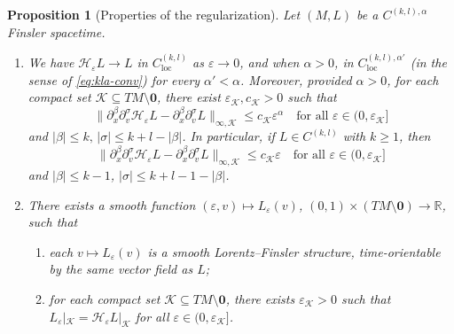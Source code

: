 \documentclass[a4paper,11pt]{article}
\numberwithin{equation}{section}
\theoremstyle{definition}
\theoremstyle{plain}
\newtheorem{Proposition}[Definition]{Proposition}
\newcommand{\R}{\mathbb R}
\newcommand{\eps}{\varepsilon}
\newcommand{\loc}{\mathrm{loc}}
\begin{document}
\begin{Proposition}[Properties of the regularization]\label{prop:PropertiesApproximation}
Let $(M,L)$ be a $C^{(k,l),\alpha}$ Finsler spacetime.
\begin{enumerate}
    \item
    \label{PropApproximation1}
    We have $\mathcal{H}_\eps L \to L$ in $C^{(k,l)}_{\loc}$ as $\eps \rightarrow 0$, and when $\alpha >0$, in $C^{(k,l), \alpha'}_{\loc}$ \textnormal{(}in the sense of \eqref{eq:kla-conv}\textnormal{)} for every $\alpha' < \alpha$.
    Moreover, provided $\alpha>0$, for each compact set $\mathcal K \subseteq TM \setminus \mathbf 0$, there exist $\varepsilon_\mathcal K, c_\mathcal K > 0$ such that
    \begin{equation*}
        \|\partial_x^\beta \partial_v^\sigma \mathcal{H}_\eps L - \partial_x^\beta \partial_v^\sigma L\|_{\infty, \mathcal{K}} \leq c_\mathcal K \eps^{\alpha} \quad \text{for all } \eps \in (0, \eps_\mathcal{K}]
    \end{equation*}
    and $|\beta| \leq k, \, |\sigma | \leq k+l-|\beta|$.
    In particular, if $L \in C^{(k,l)}$ with $k \geq 1$, then
    \begin{equation*}
        \|\partial_x^\beta \partial_v^\sigma \mathcal{H}_\eps L - \partial_x^\beta \partial_v^\sigma L\|_{\infty, \mathcal{K}} \leq c_\mathcal K \eps \quad \text{for all } \eps \in (0, \eps_\mathcal{K}]
    \end{equation*}
    and $|\beta| \leq k-1$, $|\sigma | \leq k+l-1-|\beta|$.
    \item \label{PropApproximation2}
    There exists a smooth function $(\varepsilon,v) \mapsto L_{\varepsilon}(v)$, $(0,1) \times (TM \setminus \mathbf 0) \to \R$, such that
    \begin{enumerate}
    \item each $v \mapsto L_\varepsilon(v)$ is a smooth Lorentz--Finsler structure, time-orientable by the same vector field as $L$;
    \item for each compact set $\mathcal K \subseteq TM \setminus \mathbf 0$, there exists $\varepsilon_{\mathcal K}>0$ such that $L_\varepsilon|_{\mathcal K} = \mathcal{H}_\eps L|_{\mathcal K}$ for all $\eps \in (0, \eps_{\mathcal K}]$.
    \end{enumerate}
\end{enumerate}
\end{Proposition}
\end{document}
